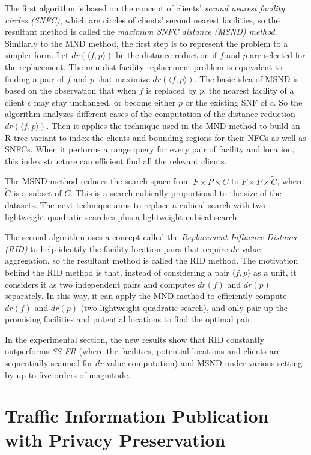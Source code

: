 \documentclass[paper=a4, fontsize=18pt]{article} %
\numberwithin{equation}{section} %
\numberwithin{figure}{section} %
\numberwithin{table}{section} %
\begin{document}
The first algorithm is based on the concept of clients' \emph{second nearest facility circles (SNFC)}, which are circles of clients' second nearest facilities, so the resultant method is called the \emph{maximum SNFC distance (MSND) method}. Similarly to the MND method, the first step is to represent the problem to a simpler form. Let $dr(\langle f, p \rangle)$ be the distance reduction if $f$ and $p$ are selected for the replacement. The min-dist facility replacement problem is equivalent to finding a pair of $f$ and $p$ that maximize $dr(\langle f, p \rangle)$. The basic idea of MSND is based on the observation that when $f$ is replaced by $p$, the nearest facility of a client $c$ may stay unchanged, or become either $p$ or the existing SNF of $c$. So the algorithm analyzes different cases of the computation of the distance reduction $dr(\langle f, p \rangle)$. Then it applies the technique used in the MND method to build an R-tree variant to index the clients and bounding regions for their NFCs as well as SNFCs. When it performs a range query for every pair of facility and location, this index structure can efficient find all the relevant clients.

The MSND method reduces the search space from $F \times P \times C$ to $F \times P \times \tilde{C}$, where $\tilde{C}$ is a subset of $C$. This is a search cubically proportional to the size of the datasets. The next technique aims to replace a cubical search with two lightweight quadratic searches plus a lightweight cubical search.

The second algorithm uses a concept called the \emph{Replacement Influence Distance (RID)} to help identify the facility-location pairs that require $dr$ value aggregation, so the resultant method is called the RID method. The motivation behind the RID method is that, instead of considering a pair $\langle f, p \rangle$ as a unit, it considers it as two independent pairs and computes $dr(f)$ and $dr(p)$ separately. In this way, it can apply the MND method to efficiently compute $dr(f)$ and $dr(p)$ (two lightweight quadratic search), and only pair up the promising facilities and potential locations to find the optimal pair.

In the experimental section, the new results show that RID constantly outperforms \emph{SS-FR} (where the facilities, potential locations and clients are sequentially scanned for $dr$ value computation) and MSND under various setting by up to five orders of magnitude.

\section{Traffic Information Publication with Privacy Preservation \cite{GLJHZ14}}
\end{document}
